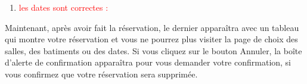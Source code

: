 \documentclass{article}
\begin{document}
\begin{enumerate}
\begin{enumerate}
               \noindent{}          
          
          
          
          
          
               
  \item \textcolor{red}{les dates sont correctes :} 
  \vspace{0.7cm}
               \hspace*{-0.7in}

               \noindent{}
  
\end{enumerate}  
  
	Maintenant, après avoir fait la réservation, le dernier apparaîtra avec un tableau qui montre votre réservation et vous ne pourrez plus visiter la page de choix des salles, des batiments ou des dates. Si vous cliquez sur le bouton Annuler, la boîte d'alerte de confirmation apparaîtra pour vous demander votre confirmation, si vous confirmez que votre réservation sera supprimée.
  

\end{enumerate}
\end{document}
